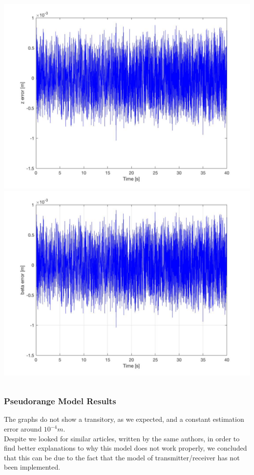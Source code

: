 \documentclass{beamer}
\begin{document}
\begin{frame}
\begin{columns}
			\centering
			\includegraphics[scale=0.1]{z_error.jpg}\\
			\includegraphics[scale=0.1]{beta_error.jpg}
		\end{columns}
	\end{frame}
	
	\begin{frame}
		\frametitle{Pseudorange Model Results}
		The graphs do not show a transitory, as we expected, and a constant estimation error around $10^{-4}m$. \\
		\vspace{0.3cm}
		Despite we looked for similar articles, written by the same authors, in order to find better explanations to why this model does not work properly, we concluded that this can be due to the fact that the model of transmitter/receiver has not been implemented.
	\end{frame}
\end{document}
